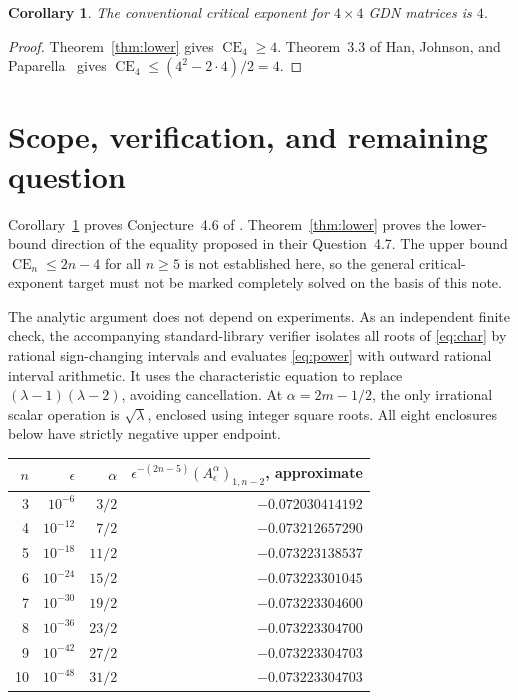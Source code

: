 \documentclass[11pt]{article}
\newtheorem{corollary}[theorem]{Corollary}
\newcommand{\CE}{\operatorname{CE}}
\begin{document}
\begin{corollary}\label{cor:ce4}
The conventional critical exponent for $4\times4$ GDN matrices is $4$.
\end{corollary}
\begin{proof}
Theorem~\ref{thm:lower} gives $\CE_4\ge4$. Theorem~3.3 of Han, Johnson, and Paparella~\cite{HJP} gives $\CE_4\le(4^2-2\cdot4)/2=4$.
\end{proof}

\section{Scope, verification, and remaining question}
Corollary~\ref{cor:ce4} proves Conjecture~4.6 of \cite{HJP}. Theorem~\ref{thm:lower} proves the lower-bound direction of the equality proposed in their Question~4.7. The upper bound $\CE_n\le2n-4$ for all $n\ge5$ is not established here, so the general critical-exponent target must not be marked completely solved on the basis of this note.

The analytic argument does not depend on experiments. As an independent finite check, the accompanying standard-library verifier isolates all roots of \eqref{eq:char} by rational sign-changing intervals and evaluates \eqref{eq:power} with outward rational interval arithmetic. It uses the characteristic equation to replace $(\lambda-1)(\lambda-2)$, avoiding cancellation. At $\alpha=2m-1/2$, the only irrational scalar operation is $\sqrt\lambda$, enclosed using integer square roots. All eight enclosures below have strictly negative upper endpoint.

\begin{center}
\begin{tabular}{@{}rrrr@{}}\toprule
$n$ & $\epsilon$ & $\alpha$ & $\epsilon^{-(2n-5)}(A_\epsilon^\alpha)_{1,n-2}$, approximate\\\midrule
3 & $10^{-6}$  & $3/2$  & $-0.072030414192$\\
4 & $10^{-12}$ & $7/2$  & $-0.073212657290$\\
5 & $10^{-18}$ & $11/2$ & $-0.073223138537$\\
6 & $10^{-24}$ & $15/2$ & $-0.073223301045$\\
7 & $10^{-30}$ & $19/2$ & $-0.073223304600$\\
8 & $10^{-36}$ & $23/2$ & $-0.073223304700$\\
9 & $10^{-42}$ & $27/2$ & $-0.073223304703$\\
10& $10^{-48}$ & $31/2$ & $-0.073223304703$\\\bottomrule
\end{tabular}
\end{center}
\end{document}
